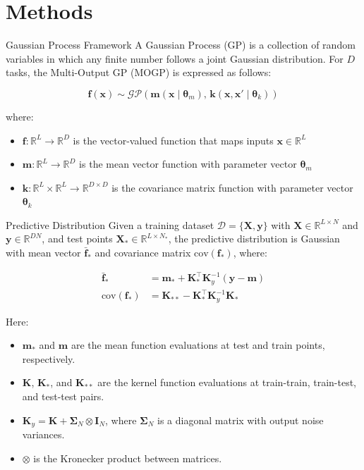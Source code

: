 \documentclass[10pt, xcolor=table]{beamer}
\begin{document}
\section*{Methods}
\begin{frame}{Gaussian Process Framework}
    A Gaussian Process (GP) is a collection of random variables in which any finite number follows a joint Gaussian distribution. For $D$ tasks, the Multi-Output GP (MOGP) is expressed as follows:

    \begin{equation*}
        \bm{f}(\bm{x}) \sim  \mathcal{GP}(\bm{m}(\bm{x} \mid \bm{\theta}_m),\, \bm{k}(\bm{x}, \bm{x}' \mid \bm{\theta}_k))
    \end{equation*}

    where:
    \begin{itemize}
        \item $\bm{f} : \mathbb{R}^L \rightarrow \mathbb{R}^D$ is the vector-valued function that maps inputs $\bm{x} \in \mathbb{R}^L$
        \item $\bm{m} : \mathbb{R}^L \rightarrow \mathbb{R}^D$ is the mean vector function with parameter vector $\bm{\theta}_m$
        \item $\bm{k}: \mathbb{R}^{L} \times \mathbb{R}^{L} \rightarrow \mathbb{R}^{D \times D}$ is the covariance matrix function with parameter vector $\bm{\theta}_k$
    \end{itemize}
\end{frame}

\begin{frame}{Predictive Distribution}
    Given a training dataset $\mathcal{D} = \{\mathbf{X}, \mathbf{y}\}$ with $\mathbf{X} \in \mathbb{R}^{L \times N}$ and $\mathbf{y} \in \mathbb{R}^{DN}$, and test points $\mathbf{X}_* \in \mathbb{R}^{L \times N_*}$, the predictive distribution is Gaussian with mean vector $\bar{\mathbf{f}}_*$ and covariance matrix $\text{cov}(\mathbf{f}_*)$, where:
    
    \begin{align*}
        \bar{\mathbf{f}}_* &= \mathbf{m}_* + \mathbf{K}_*^{\top} \mathbf{K}_y^{-1} (\mathbf{y} - \mathbf{m}) \\
        \text{cov}(\mathbf{f}_*) &= \mathbf{K}_{**} - \mathbf{K}_*^{\top} \mathbf{K}_y^{-1} \mathbf{K}_*
    \end{align*}
    
    Here:
    \begin{itemize}
        \item $\mathbf{m}_*$ and $\mathbf{m}$ are the mean function evaluations at test and train points, respectively.
        \item $\mathbf{K}$, $\mathbf{K}_{*}$, and $\mathbf{K}_{**}$ are the kernel function evaluations at train-train, train-test, and test-test pairs.
        \item $\mathbf{K}_y = \mathbf{K} + \mathbf{\Sigma}_N \otimes \mathbf{I}_N$, where $\mathbf{\Sigma}_N$ is a diagonal matrix with output noise variances.
        \item $\otimes$ is the Kronecker product between matrices.
    \end{itemize}
\end{frame}
\end{document}

